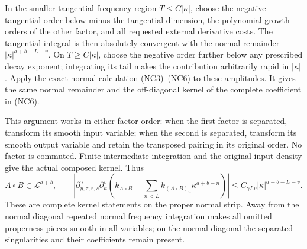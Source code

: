 \documentclass[
  11pt,
]{article}
\begin{document}
In the smaller tangential frequency region \(T\leq C|\kappa|\), choose
the negative tangential order below minus the tangential dimension, the
polynomial growth orders of the other factor, and all requested external
derivative costs. The tangential integral is then absolutely convergent
with the normal remainder \(|\kappa|^{a+b-L-v}\). On
\(T\geq C|\kappa|\), choose the negative order further below any
prescribed decay exponent; integrating its tail makes the contribution
arbitrarily rapid in \(|\kappa|\). Apply the exact normal calculation
(NC3)--(NC6) to these amplitudes. It gives the same normal remainder and
the off-diagonal kernel of the complete coefficient in (NC6).

This argument works in either factor order: when the first factor is
separated, transform its smooth input variable; when the second is
separated, transform its smooth output variable and retain the
transposed pairing in its original order. No factor is commuted. Finite
intermediate integration and the original input density give the actual
composed kernel. Thus \[
 A\circ B\in\mathcal L^{a+b},
 \qquad
 \left|\partial_{y,z,r,s}^\gamma\partial_\kappa^v
 \left(k_{A\circ B}-\sum_{n<L}k_{(A\circ B)_n}\kappa^{a+b-n}\right)\right|
 \leq C_{\gamma Lv}|\kappa|^{a+b-L-v}.
 \tag{NC7}
\] These are complete kernel statements on the proper normal strip. Away
from the normal diagonal repeated normal frequency integration makes all
omitted properness pieces smooth in all variables; on the normal
diagonal the separated singularities and their coefficients remain
present.
\end{document}
